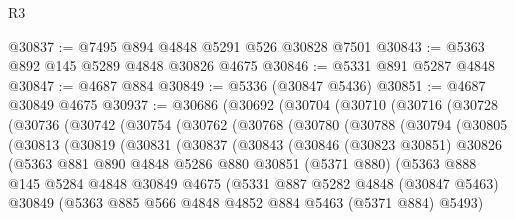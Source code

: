 \begin{lexlean}{R3}
\begin{coremodule}
@30837 := @7495 @894 @4848 @5291 @526 @30828 @7501
@30843 := @5363 @892 @145 @5289 @4848 @30826 @4675
@30846 := @5331 @891 @5287 @4848
@30847 := @4687 @884
@30849 := @5336 (@30847 @5436)
@30851 := @4687 @30849 @4675
@30937 := @30686
    (@30692
      (@30704
        (@30710
          (@30716
            (@30728
              (@30736
                (@30742
                  (@30754
                    (@30762
                      (@30768
                        (@30780
                          (@30788
                            (@30794
                              (@30805
                                (@30813
                                  (@30819
                                    (@30831
                                      (@30837
                                        (@30843
                                          (@30846
                                            (@30823 @30851)
                                            @30826
                                            (@5363
                                              @881
                                              @890
                                              @4848
                                              @5286
                                              @880
                                              @30851
                                              (@5371 @880)
                                              (@5363
                                                @888
                                                @145
                                                @5284
                                                @4848
                                                @30849
                                                @4675
                                                (@5331
                                                  @887
                                                  @5282
                                                  @4848
                                                  (@30847 @5463)
                                                  @30849
                                                  (@5363
                                                    @885
                                                    @566
                                                    @4848
                                                    @4852
                                                    @884
                                                    @5463
                                                    (@5371 @884)
                                                    @5493)

\end{coremodule}
\end{lexlean}
